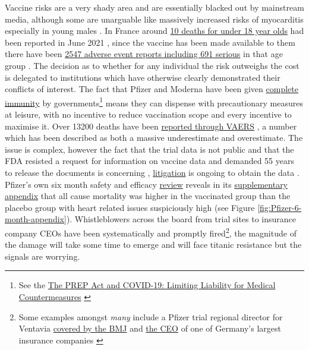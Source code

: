 \documentclass[11pt,a4paper,notitlepage]{report}
\begin{document}

Vaccine risks are a very shady area and are essentially blacked out by mainstream media, although some are unarguable like massively increased risks of myocarditis especially in young males \cite{10.1001/jama.2021.24110}. In France around \href{https://www.liberation.fr/checknews/combien-de-moins-de-18-ans-sans-comorbidite-sont-morts-du-covid-19-20210702_MGGZB2ZKPNHAPI3UJNNLLKZRFE/}{10 deaths for under 18 year olds} had been reported in June 2021 \cite{liberation02072021}, since the vaccine has been made available to them there have been \href{https://ansm.sante.fr/uploads/2022/02/04/20220207-covid-19-vaccins-fiche-synthese.pdf}{2547 adverse event reports including 691 serious} in that age group \cite{ansm04022022}. The decision as to whether for any individual the risk outweighs the cost is delegated to institutions which have otherwise clearly demonstrated their conflicts of interest. The fact that Pfizer and Moderna have been given \href{https://www.cnbc.com/2020/12/16/covid-vaccine-side-effects-compensation-lawsuit.html}{complete immunity} \cite{cnbc17122020} by governments\footnote{See the \href{https://crsreports.congress.gov/product/pdf/LSB/LSB10443}{The PREP Act and COVID-19: Limiting Liability for Medical Countermeasures} \cite{cnsreports13012022}} means they can dispense with precautionary measures at leisure, with no incentive to reduce vaccination scope and every incentive to maximise it. Over 13200 deaths have been \href{https://www.cdc.gov/coronavirus/2019-ncov/vaccines/safety/adverse-events.html}{reported through VAERS} \cite{cdc14032022}, a number which has been described as both a massive underestimate and overestimate. The issue is complex, however the fact that the trial data is not public and that the FDA resisted a request for information on vaccine data and demanded 55 years to release the documents is concerning \cite{mailonline19112021}, \href{https://phmpt.org/}{litigation} is ongoing to obtain the data \cite{phmpt}. Pfizer's own six month safety and efficacy \href{https://www.nejm.org/doi/full/10.1056/NEJMoa2110345}{review} \cite{doi:10.1056/NEJMoa2110345} reveals in its \href{https://www.nejm.org/doi/suppl/10.1056/NEJMoa2110345/suppl_file/nejmoa2110345_appendix.pdf}{supplementary appendix} \cite{doi:10.1056/NEJMoa2110345-appendix} that all cause mortality was higher in the vaccinated group than the placebo group with heart related issues suspiciously high (see Figure \ref{fig:Pfizer-6-month-appendix}). Whistleblowers across the board from trial sites to insurance company CEOs have been systematically and promptly fired\footnote{Some examples amongst \textit{many} include a Pfizer trial regional director for Ventavia \href{https://www.bmj.com/content/375/bmj.n2635}{covered by the BMJ} \cite{bmj02112021} and \href{https://childrenshealthdefense.org/defender/german-insurance-fires-andreas-schofbeck-covid-vaccine-injuries-data/}{the CEO} of one of Germany's largest insurance companies \cite{defender140322}}, the magnitude of the damage will take some time to emerge and will face titanic resistance but the signals are worrying.
\end{document}
